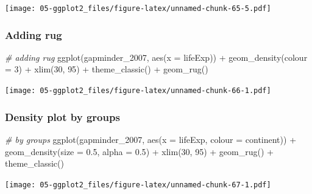 \documentclass[
]{book}
\newenvironment{Shaded}{\begin{snugshade}}{\end{snugshade}}
\newcommand{\AttributeTok}[1]{\textcolor[rgb]{0.77,0.63,0.00}{#1}}
\newcommand{\CommentTok}[1]{\textcolor[rgb]{0.56,0.35,0.01}{\textit{#1}}}
\newcommand{\DecValTok}[1]{\textcolor[rgb]{0.00,0.00,0.81}{#1}}
\newcommand{\FloatTok}[1]{\textcolor[rgb]{0.00,0.00,0.81}{#1}}
\newcommand{\FunctionTok}[1]{\textcolor[rgb]{0.00,0.00,0.00}{#1}}
\newcommand{\NormalTok}[1]{#1}
\newcommand{\SpecialCharTok}[1]{\textcolor[rgb]{0.00,0.00,0.00}{#1}}
\begin{document}
\texttt{[image: 05-ggplot2\_files/figure-latex/unnamed-chunk-65-5.pdf]}

\hypertarget{adding-rug}{%
\subsubsection{Adding rug}\label{adding-rug}}

\begin{Shaded}
\begin{Highlighting}[]
\CommentTok{\# adding rug}
\FunctionTok{ggplot}\NormalTok{(gapminder\_2007, }\FunctionTok{aes}\NormalTok{(}\AttributeTok{x =}\NormalTok{ lifeExp)) }\SpecialCharTok{+} 
   \FunctionTok{geom\_density}\NormalTok{(}\AttributeTok{colour =} \DecValTok{3}\NormalTok{) }\SpecialCharTok{+}
   \FunctionTok{xlim}\NormalTok{(}\DecValTok{30}\NormalTok{, }\DecValTok{95}\NormalTok{) }\SpecialCharTok{+}
   \FunctionTok{theme\_classic}\NormalTok{() }\SpecialCharTok{+}
   \FunctionTok{geom\_rug}\NormalTok{() }
\end{Highlighting}
\end{Shaded}

\texttt{[image: 05-ggplot2\_files/figure-latex/unnamed-chunk-66-1.pdf]}

\hypertarget{density-plot-by-groups}{%
\subsubsection{Density plot by groups}\label{density-plot-by-groups}}

\begin{Shaded}
\begin{Highlighting}[]
\CommentTok{\# by groups}
\FunctionTok{ggplot}\NormalTok{(gapminder\_2007, }\FunctionTok{aes}\NormalTok{(}\AttributeTok{x =}\NormalTok{ lifeExp, }\AttributeTok{colour =}\NormalTok{ continent)) }\SpecialCharTok{+}
   \FunctionTok{geom\_density}\NormalTok{(}\AttributeTok{size =} \FloatTok{0.5}\NormalTok{, }\AttributeTok{alpha =} \FloatTok{0.5}\NormalTok{) }\SpecialCharTok{+}
   \FunctionTok{xlim}\NormalTok{(}\DecValTok{30}\NormalTok{, }\DecValTok{95}\NormalTok{) }\SpecialCharTok{+}
   \FunctionTok{geom\_rug}\NormalTok{() }\SpecialCharTok{+}
   \FunctionTok{theme\_classic}\NormalTok{() }
\end{Highlighting}
\end{Shaded}

\texttt{[image: 05-ggplot2\_files/figure-latex/unnamed-chunk-67-1.pdf]}
\end{document}
